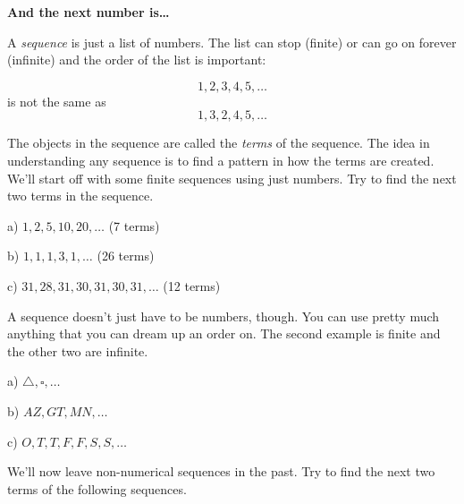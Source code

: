 \documentclass[12pt]{article}
\newcommand{\numb}[1]{\noindent{\bf #1)}}
\begin{document}
\centerline{\bf And the next number is\dots}

\bigskip


A \textit{sequence} is just a list of numbers. The list can stop (finite) or can go on forever (infinite) and the order of the list is important:

\[
1,2,3,4,5,\dots
\]
is not the same as
\[
1,3,2,4,5,\dots
\]

The objects in the sequence are called the \textit{terms} of the sequence. The idea in understanding any sequence is to find a pattern in how the terms are created. We'll start off with some finite sequences using just numbers. Try to find the next two terms in the sequence. 

\bigskip

\numb{1} a) $1,2,5,10,20,\dots$ (7 terms)

\vspace{1in}

b) $1,1,1,3,1,\dots$ (26 terms)

\vspace{1in}

c) $31,28,31,30,31,30,31,\dots$ (12 terms)

\newpage


\numb{2} A sequence doesn't just have to be numbers, though. You can use pretty much anything that you can dream up an order on. The second example is finite and the other two are infinite. 

\bigskip

a) $\triangle,\square,\dots$

\vspace{1in}

b) $AZ,GT,MN,\dots$

\vspace{1in}

c) $O,T,T,F,F,S,S,\dots$

\newpage


\numb{3} We'll now leave non-numerical sequences in the past. Try to find the next two terms of the following sequences.
\end{document}
